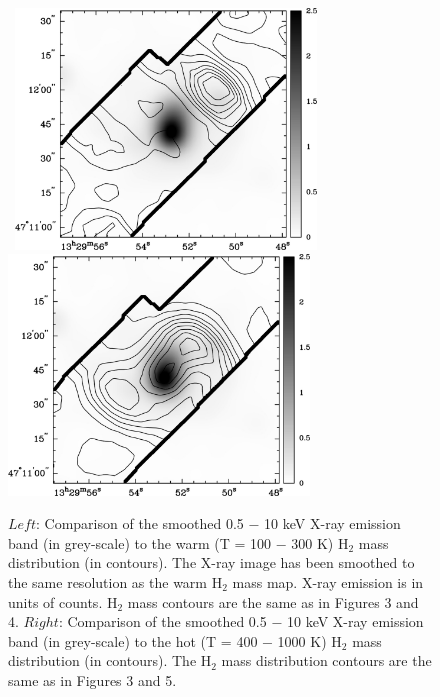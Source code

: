 \documentclass[manuscript]{aastex}
\begin{document}
\begin{figure}[!t]
\centerline{\hbox{ \hspace{0.0in} 
\includegraphics[width=8cm,angle=0]{x_v_cold.jpg}
\hspace{0.1in}
\includegraphics[width=8cm,angle=0]{x_v_warm.jpg}}}
\caption{$Left$:  Comparison of the smoothed 0.5 $-$ 10 keV X-ray emission band (in grey-scale) to the warm (T = 100 $-$ 300 K) $\mathrm{H_2}$ mass distribution (in contours).   The X-ray image has been smoothed to the same resolution as the warm $\mathrm{H_2}$ mass map.  X-ray emission is in units of counts.  $\mathrm{H_2}$ mass contours are the same as in Figures 3 and 4.  $Right$: Comparison of the smoothed 0.5 $-$ 10 keV X-ray emission band (in grey-scale) to the hot (T = 400 $-$ 1000 K) $\mathrm{H_2}$ mass distribution (in contours).  The $\mathrm{H_2}$ mass distribution contours are the same as in Figures 3 and 5.\label{fig12}}
\end{figure}

\clearpage
\end{document}
